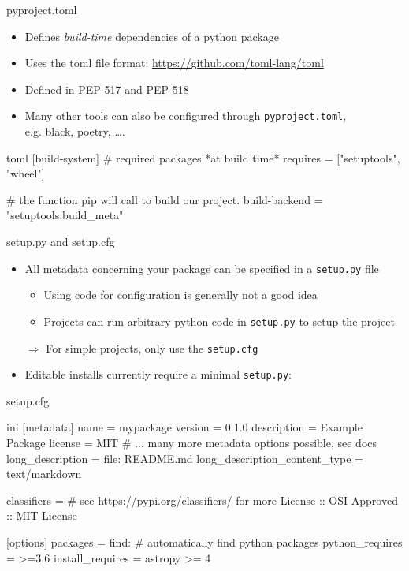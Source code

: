 \documentclass[
  aspectratio=1610,
]{beamer}
\begin{document}
\begin{frame}[c, fragile]{pyproject.toml}
  \begin{itemize}
    \item Defines \emph{build-time} dependencies of a python package
    \item Uses the toml file format: \url{https://github.com/toml-lang/toml}
    \item Defined in \href{https://www.python.org/dev/peps/pep-0517/}{PEP 517} and \href{https://www.python.org/dev/peps/pep-0518/}{PEP 518}
    \item Many other tools can also be configured through \texttt{pyproject.toml},\\ e.g. black, poetry, \ldots.
  \end{itemize}

  \begin{code}[title={Minimal pyproject.toml file for projects using setuptools}]{toml}
    [build-system]
    # required packages *at build time*
    requires = ["setuptools", "wheel"]

    # the function pip will call to build our project.
    build-backend = "setuptools.build_meta"
  \end{code}
\end{frame}

\begin{frame}[c, fragile]{setup.py and setup.cfg}
  \begin{itemize}
    \item All metadata concerning your package can be specified in a \texttt{setup.py} file
      \begin{itemize}
        \item Using code for configuration is generally not a good idea
        \item Projects can run arbitrary python code in \texttt{setup.py} to setup the project
      \end{itemize}
    \item[$\Rightarrow$] For simple projects, only use the \texttt{setup.cfg}
    \item Editable installs currently require a minimal \texttt{setup.py}:
  \end{itemize}
\end{frame}

\begin{frame}[c, fragile]{setup.cfg}
  \begin{code}{ini}
    [metadata]
    name = mypackage
    version = 0.1.0
    description = Example Package
    license = MIT
    # ... many more metadata options possible, see docs
    long_description = file: README.md
    long_description_content_type = text/markdown

    classifiers =
      # see https://pypi.org/classifiers/ for more
      License :: OSI Approved :: MIT License

    [options]
    packages = find:  # automatically find python packages
    python_requires = >=3.6
    install_requires =
      astropy >= 4
  \end{code}
\end{frame}
\end{document}
